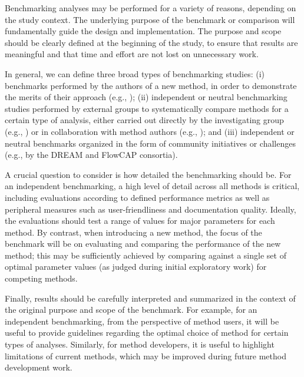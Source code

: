 \documentclass[12pt, a4paper]{article}
\begin{document}
Benchmarking analyses may be performed for a variety of reasons, depending on the study context. The underlying purpose of the benchmark or comparison will fundamentally guide the design and implementation. The purpose and scope should be clearly defined at the beginning of the study, to ensure that results are meaningful and that time and effort are not lost on unnecessary work.

In general, we can define three broad types of benchmarking studies: (i) benchmarks performed by the authors of a new method, in order to demonstrate the merits of their approach (e.g., \citep{Weber2018, Nowicka2016, Levine2015, Zhou2014, Law2014}); (ii) independent or neutral benchmarking studies performed by external groups to systematically compare methods for a certain type of analysis, either carried out directly by the investigating group (e.g., \citep{Duo2018, Saelens2018a, Saelens2018b, Soneson2018, Weber2016, Baruzzo2017, Kanitz2015, Soneson2013, Rapaport2013, Dillies2012}) or in collaboration with method authors (e.g., \citep{Sage2015}); and (iii) independent or neutral benchmarks organized in the form of community initiatives or challenges (e.g., by the DREAM \citep{Weirauch2013, Costello2014, Kuffner2015, Ewing2015, Hill2016} and FlowCAP \citep{Aghaeepour2013, Aghaeepour2016} consortia).

A crucial question to consider is how detailed the benchmarking should be. For an independent benchmarking, a high level of detail across all methods is critical, including evaluations according to defined performance metrics as well as peripheral measures such as user-friendliness and documentation quality. Ideally, the evaluations should test a range of values for major parameters for each method. By contrast, when introducing a new method, the focus of the benchmark will be on evaluating and comparing the performance of the new method; this may be sufficiently achieved by comparing against a single set of optimal parameter values (as judged during initial exploratory work) for competing methods.

Finally, results should be carefully interpreted and summarized in the context of the original purpose and scope of the benchmark. For example, for an independent benchmarking, from the perspective of method users, it will be useful to provide guidelines regarding the optimal choice of method for certain types of analyses. Similarly, for method developers, it is useful to highlight limitations of current methods, which may be improved during future method development work.
\end{document}
